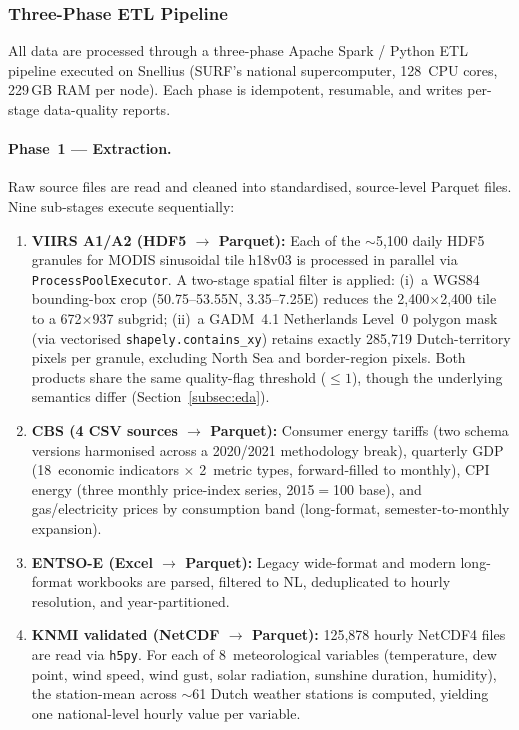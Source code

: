 \subsubsection{Three-Phase ETL Pipeline}
\label{subsubsec:pipeline}

All data are processed through a three-phase Apache Spark / Python ETL pipeline executed on Snellius (SURF's national supercomputer, 128~CPU cores, 229\,GB RAM per node). Each phase is idempotent, resumable, and writes per-stage data-quality reports.

\paragraph{Phase~1 — Extraction.}
Raw source files are read and cleaned into standardised, source-level Parquet files. Nine sub-stages execute sequentially:

\begin{enumerate}
    \item \textbf{VIIRS A1/A2 (HDF5 $\to$ Parquet):} Each of the $\sim$5{,}100 daily HDF5 granules for MODIS sinusoidal tile h18v03 is processed in parallel via \texttt{ProcessPoolExecutor}. A two-stage spatial filter is applied: (i)~a WGS84 bounding-box crop (50.75--53.55\textdegree N, 3.35--7.25\textdegree E) reduces the 2{,}400$\times$2{,}400 tile to a 672$\times$937 subgrid; (ii)~a GADM~4.1 Netherlands Level~0 polygon mask (via vectorised \texttt{shapely.contains\_xy}) retains exactly 285{,}719 Dutch-territory pixels per granule, excluding North Sea and border-region pixels. Both products share the same quality-flag threshold ($\leq 1$), though the underlying semantics differ (Section~\ref{subsec:eda}).
    \item \textbf{CBS (4 CSV sources $\to$ Parquet):} Consumer energy tariffs (two schema versions harmonised across a 2020/2021 methodology break), quarterly GDP (18~economic indicators $\times$ 2~metric types, forward-filled to monthly), CPI energy (three monthly price-index series, 2015$=$100 base), and gas/electricity prices by consumption band (long-format, semester-to-monthly expansion).
    \item \textbf{ENTSO-E (Excel $\to$ Parquet):} Legacy wide-format and modern long-format workbooks are parsed, filtered to NL, deduplicated to hourly resolution, and year-partitioned.
    \item \textbf{KNMI validated (NetCDF $\to$ Parquet):} 125{,}878 hourly NetCDF4 files are read via \texttt{h5py}. For each of 8~meteorological variables (temperature, dew point, wind speed, wind gust, solar radiation, sunshine duration, humidity), the station-mean across $\sim$61 Dutch weather stations is computed, yielding one national-level hourly value per variable.
\end{enumerate}

